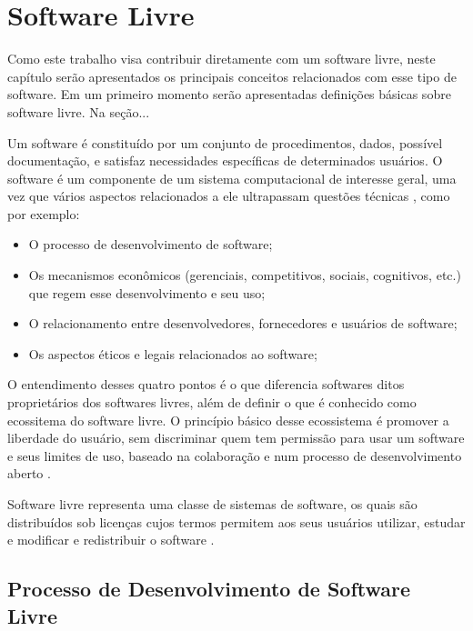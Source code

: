 \chapter{Software Livre}

Como este trabalho visa contribuir diretamente com um software livre, neste capítulo serão apresentados os principais conceitos relacionados com esse tipo de software. Em um primeiro momento serão apresentadas definições básicas sobre software livre. Na seção...%

Um software é constituído por um conjunto de procedimentos, dados, possível documentação, e satisfaz necessidades específicas de determinados usuários. O software é um componente de um sistema computacional de interesse geral, uma vez que vários aspectos relacionados a ele ultrapassam questões técnicas \cite{meirelles2013metrics}, como por exemplo: 

\begin{itemize}
\item O processo de desenvolvimento de software;
\item Os mecanismos econômicos (gerenciais, competitivos, sociais, cognitivos, etc.) que regem esse desenvolvimento e seu uso;
\item O relacionamento entre desenvolvedores, fornecedores e usuários de software;
\item Os aspectos éticos e legais relacionados ao software;
\end{itemize}

O entendimento desses quatro pontos é o que diferencia softwares ditos proprietários dos softwares livres, além de definir o que é conhecido como ecossitema do software livre. O princípio básico desse ecossistema é promover a liberdade do usuário, sem discriminar quem tem permissão para usar um software e seus limites de uso, baseado na colaboração e num processo de desenvolvimento aberto \cite{meirelles2013metrics}.

Software livre representa uma classe de sistemas de software, os quais são distribuídos sob licenças cujos termos permitem aos seus usuários utilizar, estudar e modificar e redistribuir o software \cite{terceiro2012freesoftware}. 

\section{Processo de Desenvolvimento de Software Livre}

